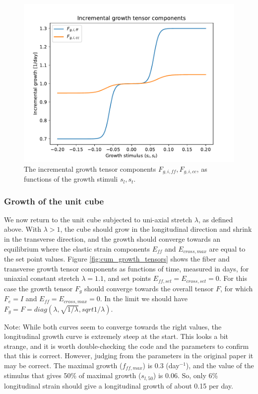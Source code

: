 \documentclass[a4paper,10pt]{article}
\begin{document}
\begin{figure}
  \centerline{
    \includegraphics{figs/incr_growth_tensor}
  }
\caption{The incremental growth tensor components $F_{g,i,ff}, F_{g,i,cc}$, as functions of the growth stimuli $s_l, s_t$.} 
\label{fig:incr_growth_tensors}
\end{figure}

\subsubsection{Growth of the unit cube}
We now return to the unit cube subjected to uni-axial stretch $\lambda$, as defined above. With $\lambda > 1$, the cube 
should grow in the longitudinal direction and shrink in the transverse direction, and the growth should converge towards
an equilibrium where the elastic strain components $E_{ff}$ and $E_{cross,max}$ are equal to the set point values.
Figure \ref{fig:cum_growth_tensors} shows the fiber and transverse growth tensor components as functions of time, 
measured in days, for uniaxial constant stretch $\lambda = 1.1$, and set points $E_{ff, set} = E_{cross,set} = 0$. 
For this case the growth tensor $F_g$ should converge towards the overall tensor $F$, for which $F_e = I$ and 
$E_{ff} = E_{cross,max} = 0$.  In the limit we should have $F_g = F = diag(\lambda, \sqrt{1/\lambda}, sqrt{1/\lambda})$. 


Note: While both curves seem to converge towards the right values, the longitudinal growth curve is extremely steep at 
the start. This looks a bit strange, and it is worth double-checking the code and the parameters to confirm that this is correct.
However, judging from the parameters in the original paper it may be correct. The maximal growth ($f_{ff,max}$) is 0.3 (day$^{-1}$), 
and the value of the stimulus that gives 50\% of maximal growth ($s_{l,50}$) is 0.06. So, only 6\% longitudinal strain should give a 
longitudinal growth of about 0.15 per day. 
\end{document}
